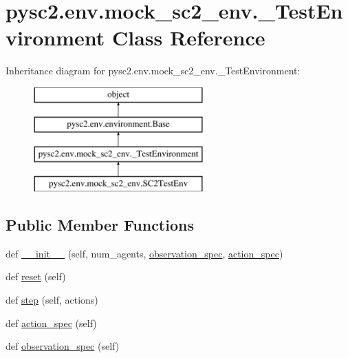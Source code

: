 \hypertarget{classpysc2_1_1env_1_1mock__sc2__env_1_1___test_environment}{}\section{pysc2.\+env.\+mock\+\_\+sc2\+\_\+env.\+\_\+\+Test\+Environment Class Reference}
\label{classpysc2_1_1env_1_1mock__sc2__env_1_1___test_environment}
Inheritance diagram for pysc2.\+env.\+mock\+\_\+sc2\+\_\+env.\+\_\+\+Test\+Environment\+:\begin{figure}[H]
\begin{center}
\leavevmode
\includegraphics[height=4.000000cm]{classpysc2_1_1env_1_1mock__sc2__env_1_1___test_environment}
\end{center}
\end{figure}
\subsection*{Public Member Functions}
\begin{DoxyCompactItemize}
\item 
def \mbox{\hyperlink{classpysc2_1_1env_1_1mock__sc2__env_1_1___test_environment_ad3acb8d357a313a916e134895503f4bd}{\+\_\+\+\_\+init\+\_\+\+\_\+}} (self, num\+\_\+agents, \mbox{\hyperlink{classpysc2_1_1env_1_1mock__sc2__env_1_1___test_environment_a231da0c879e81efdb7a929be37f22311}{observation\+\_\+spec}}, \mbox{\hyperlink{classpysc2_1_1env_1_1mock__sc2__env_1_1___test_environment_ae7ce75b41709291c06f255bf682172bb}{action\+\_\+spec}})
\item 
def \mbox{\hyperlink{classpysc2_1_1env_1_1mock__sc2__env_1_1___test_environment_a995a511044613e7d5f4452a6238cd3eb}{reset}} (self)
\item 
def \mbox{\hyperlink{classpysc2_1_1env_1_1mock__sc2__env_1_1___test_environment_affd351d46e26ada4c242072c08418ae1}{step}} (self, actions)
\item 
def \mbox{\hyperlink{classpysc2_1_1env_1_1mock__sc2__env_1_1___test_environment_ae7ce75b41709291c06f255bf682172bb}{action\+\_\+spec}} (self)
\item 
def \mbox{\hyperlink{classpysc2_1_1env_1_1mock__sc2__env_1_1___test_environment_a231da0c879e81efdb7a929be37f22311}{observation\+\_\+spec}} (self)
\end{DoxyCompactItemize}
